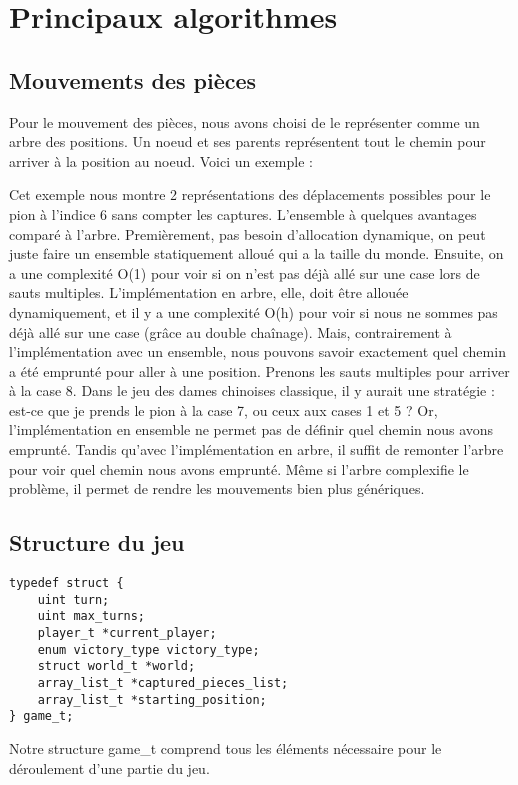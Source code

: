 \section{Principaux algorithmes}
\subsection{Mouvements des pièces}
Pour le mouvement des pièces, nous avons choisi de le représenter comme
un arbre des positions. Un noeud et ses parents représentent tout le 
chemin pour arriver à la position au noeud. Voici un exemple :



Cet exemple nous montre 2 représentations des déplacements possibles pour
le pion à l'indice 6 sans compter les captures. L'ensemble à quelques avantages comparé à l'arbre.
Premièrement, pas besoin d'allocation dynamique, on peut juste faire un ensemble statiquement alloué
qui a la taille du monde. Ensuite, on a une complexité O(1) pour voir si on n'est pas déjà allé sur une case
lors de sauts multiples. L'implémentation en arbre, elle, doit être allouée dynamiquement,
et il y a une complexité O(h) pour voir si nous ne sommes pas déjà allé sur une case (grâce au double chaînage).
Mais, contrairement à l'implémentation avec un ensemble, nous pouvons savoir
exactement quel chemin a été emprunté pour aller à une position. Prenons les sauts
multiples pour arriver à la case 8. Dans le jeu des dames chinoises classique,
il y aurait une stratégie : est-ce que je prends le pion à la case 7, ou ceux aux cases 1 et 5 ?
Or, l'implémentation en ensemble ne permet pas de définir quel chemin nous avons emprunté.
Tandis qu'avec l'implémentation en arbre, il suffit de remonter l'arbre pour voir quel chemin nous avons emprunté.
Même si l'arbre complexifie le problème, il permet de rendre les mouvements bien plus génériques.


\subsection{Structure du jeu}

\begin{verbatim}
typedef struct {
    uint turn;
    uint max_turns;
    player_t *current_player;
    enum victory_type victory_type;
    struct world_t *world;
    array_list_t *captured_pieces_list;
    array_list_t *starting_position;
} game_t;
\end{verbatim}


Notre structure game\_t comprend tous les éléments nécessaire pour le déroulement d'une partie du jeu.


